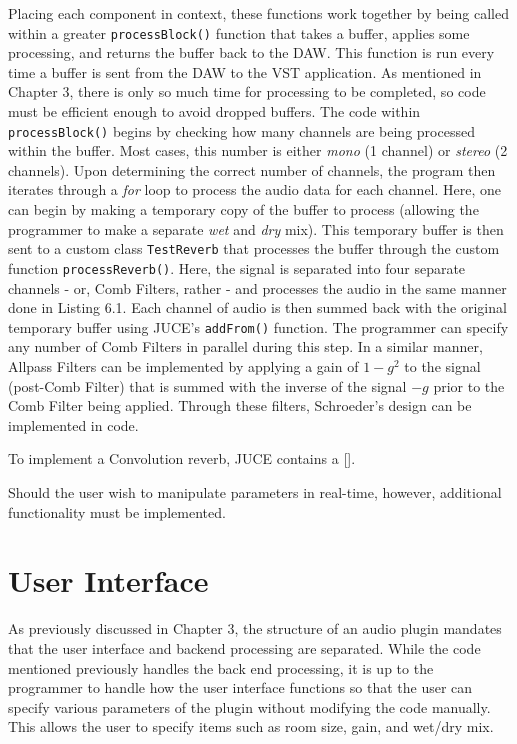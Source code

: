 \begin{singlespace}

\end{singlespace} \hfill \break
\hspace*{0.6cm}Placing each component in context, these functions work together by being called within a greater \verb|processBlock()| function that takes a buffer, applies some processing, and returns the buffer back to the DAW. This function is run every time a buffer is sent from the DAW to the VST application. As mentioned in Chapter 3, there is only so much time for processing to be completed, so code must be efficient enough to avoid dropped buffers. The code within \verb|processBlock()| begins by checking how many channels are being processed within the buffer. Most cases, this number is either \textit{mono} (1 channel) or \textit{stereo} (2 channels). Upon determining the correct number of channels, the program then iterates through a \textit{for} loop to process the audio data for each channel. Here, one can begin by making a temporary copy of the buffer to process (allowing the programmer to make a separate \textit{wet} and \textit{dry} mix). This temporary buffer is then sent to a custom class \verb|TestReverb| that processes the buffer through the custom function \verb|processReverb()|. Here, the signal is separated into four separate channels - or, Comb Filters, rather - and processes the audio in the same manner done in Listing 6.1. Each channel of audio is then summed back with the original temporary buffer using JUCE's \verb|addFrom()| function. The programmer can specify any number of Comb Filters in parallel during this step. In a similar manner, Allpass Filters can be implemented by applying a gain of $1 - g^2$ to the signal (post-Comb Filter) that is summed with the inverse of the signal $-g$ prior to the Comb Filter being applied. Through these filters, Schroeder's design can be implemented in code.

To implement a Convolution reverb, JUCE contains a \verb|| [].

Should the user wish to manipulate parameters in real-time, however, additional functionality must be implemented.

\section{User Interface}
As previously discussed in Chapter 3, the structure of an audio plugin mandates that the user interface and backend processing are separated. While the code mentioned previously handles the back end processing, it is up to the programmer to handle how the user interface functions so that the user can specify various parameters of the plugin without modifying the code manually. This allows the user to specify items such as room size, gain, and wet/dry mix.

